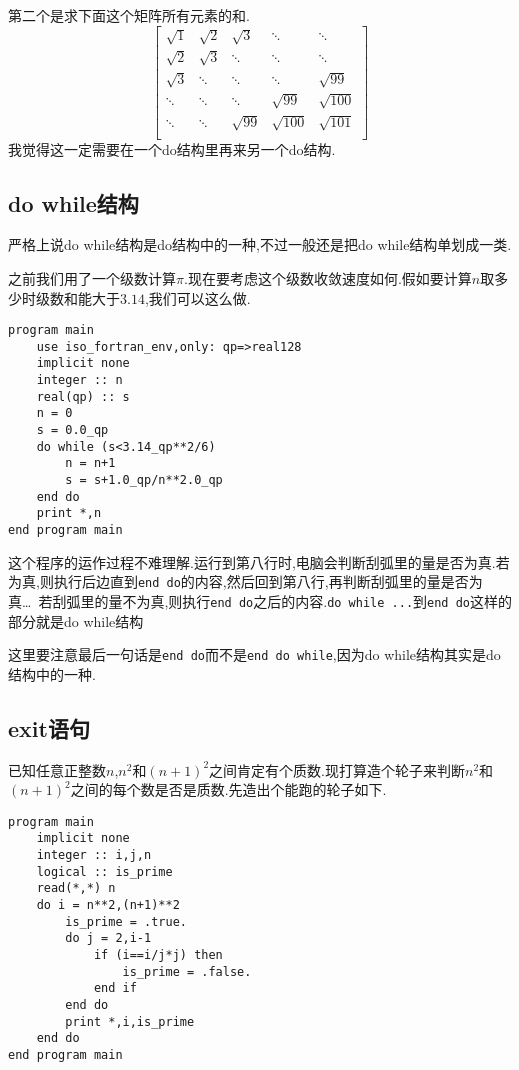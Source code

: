 第二个是求下面这个矩阵所有元素的和.\label{hw_2}
\begin{equation*}
    \begin{bmatrix}
        \sqrt{1}     &\sqrt{2}     &\sqrt{3}     &\ddots&\ddots\\
        \sqrt{2}     &\sqrt{3}     &\ddots&\ddots&\ddots\\
        \sqrt{3}     &\ddots&\ddots&\ddots&\sqrt{99}    \\
        \ddots&\ddots&\ddots&\sqrt{99}    &\sqrt{100}    \\
        \ddots&\ddots&\sqrt{99}    &\sqrt{100}   &\sqrt{101}   \\
    \end{bmatrix}
\end{equation*}
我觉得这一定需要在一个do结构里再来另一个do结构.

\subsection{do while结构}

严格上说do while结构是do结构中的一种,不过一般还是把do while结构单划成一类.

之前我们用了一个级数计算$\pi$.现在要考虑这个级数收敛速度如何.假如要计算$n$取多少时级数和能大于$3.14$,我们可以这么做.
\begin{lstlisting}
program main
    use iso_fortran_env,only: qp=>real128
    implicit none
    integer :: n
    real(qp) :: s
    n = 0
    s = 0.0_qp
    do while (s<3.14_qp**2/6)
        n = n+1
        s = s+1.0_qp/n**2.0_qp
    end do
    print *,n
end program main
\end{lstlisting}
这个程序的运作过程不难理解.运行到第八行时,电脑会判断刮弧里的量是否为真.若为真,则执行后边直到\texttt{end do}的内容,然后回到第八行,再判断刮弧里的量是否为真\dots~若刮弧里的量不为真,则执行\texttt{end do}之后的内容.\texttt{do while ...}到\texttt{end do}这样的部分就是do while结构

这里要注意最后一句话是\texttt{end do}而不是\texttt{end do while},因为do while结构其实是do结构中的一种.

\subsection{exit语句}\label{fortran_exit}

已知任意正整数$n$,$n^2$和$(n+1)^2$之间肯定有个质数.现打算造个轮子来判断$n^2$和$(n+1)^2$之间的每个数是否是质数.先造出个能跑的轮子如下.
\begin{lstlisting}
program main
    implicit none
    integer :: i,j,n
    logical :: is_prime
    read(*,*) n
    do i = n**2,(n+1)**2
        is_prime = .true.
        do j = 2,i-1
            if (i==i/j*j) then
                is_prime = .false.
            end if
        end do
        print *,i,is_prime
    end do
end program main
\end{lstlisting}

